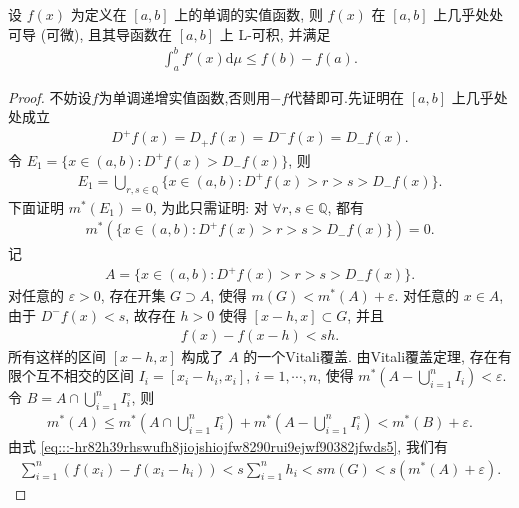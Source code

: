 \documentclass[../../main.tex]{subfiles}%
\begin{document}
\begin{theorem}\label{theorem:Lebesgue定理--实变函数}
设 $f(x)$ 为定义在 $[a,b]$ 上的单调的实值函数, 则 $f(x)$ 在 $[a,b]$ 上几乎处处可导 (可微), 且其导函数在 $[a,b]$ 上 L-可积, 并满足
\begin{align}
\int_a^b f'(x)\mathrm{d}\mu \leqslant f(b)-f(a).\label{eq:::-hr82h39rhswufh8jiojshiojfw8290rui9ejwf90382jfwds3}
\end{align}
\end{theorem}
\begin{proof}

不妨设$f$为单调递增实值函数,否则用$-f$代替即可.先证明在 $[a,b]$ 上几乎处处成立
\begin{align}
D^+f(x)=D_+f(x)=D^-f(x)=D_-f(x).\label{eq:::-hr82h39rhswufh8jiojshiojfw8290rui9ejwf90382jfwds4}
\end{align}
令 $E_1 = \{x\in(a,b): D^+f(x) > D_-f(x)\}$, 则
\begin{align*}
E_1 = \bigcup_{r,s\in\mathbb{Q}} \{x\in(a,b): D^+f(x) > r > s > D_-f(x)\}.
\end{align*}
下面证明 $m^*(E_1)=0$, 为此只需证明: 对 $\forall r,s\in\mathbb{Q}$, 都有
\begin{align*}
m^*(\{x\in(a,b): D^+f(x) > r > s > D_-f(x)\}) = 0.
\end{align*}
记
\begin{align*}
A = \{x\in(a,b): D^+f(x) > r > s > D_-f(x)\}.
\end{align*}
对任意的 $\varepsilon>0$, 存在开集 $G\supset A$, 使得 $m(G) < m^*(A)+\varepsilon$. 对任意的 $x\in A$, 由于 $D^-f(x) < s$, 故存在 $h>0$ 使得 $[x-h,x]\subset G$, 并且
\begin{align}
f(x)-f(x-h) < sh.\label{eq:::-hr82h39rhswufh8jiojshiojfw8290rui9ejwf90382jfwds5}
\end{align}
所有这样的区间 $[x-h,x]$ 构成了 $A$ 的一个Vitali覆盖. 由Vitali覆盖定理, 存在有限个互不相交的区间 $I_i = [x_i-h_i,x_i]$, $i=1,\cdots,n$, 使得 $m^*(A-\bigcup_{i=1}^n I_i) < \varepsilon$. 令 $B = A\cap\bigcup_{i=1}^n I_i^\circ$, 则
\begin{align}
m^*(A) \leqslant m^*\!\left(A\cap\bigcup_{i=1}^n I_i^\circ\right) + m^*\!\left(A-\bigcup_{i=1}^n I_i^\circ\right) < m^*(B) + \varepsilon.\label{eq:::-hr82h39rhswufh8jiojshiojfw8290rui9ejwf90382jfwds6}
\end{align}
由式 \eqref{eq:::-hr82h39rhswufh8jiojshiojfw8290rui9ejwf90382jfwds5}, 我们有
\begin{align}
\sum_{i=1}^n (f(x_i)-f(x_i-h_i)) < s\sum_{i=1}^n h_i < sm(G) < s(m^*(A)+\varepsilon).\label{eq:::-hr82h39rhswufh8jiojshiojfw8290rui9ejwf90382jfwds7}

\end{align}
\end{proof}
\end{document}
